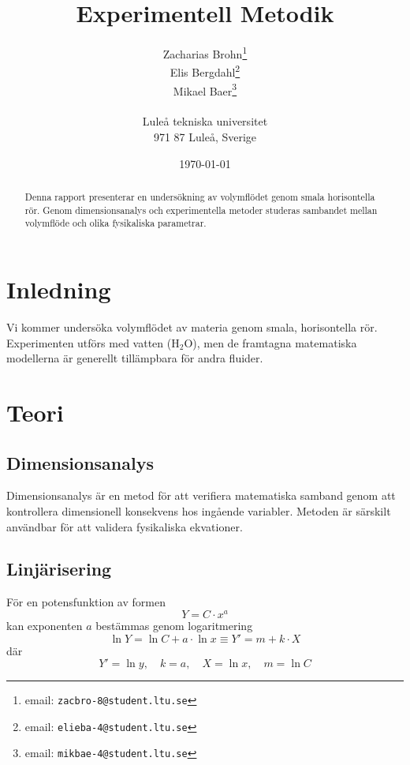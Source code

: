 \documentclass[a4paper,12pt]{article}
\begin{document}
%
\title{Experimentell Metodik}
%
\author{Zacharias Brohn\thanks{email: \texttt{zacbro-8@student.ltu.se}}\\  
        Elis Bergdahl\thanks{email: \texttt{elieba-4@student.ltu.se}} \\
        Mikael Baer\thanks{email: \texttt{mikbae-4@student.ltu.se}} \\
        \\
        Luleå tekniska universitet \\ 
        971 87 Luleå, Sverige}
%
\date{\today}
%
\maketitle
%
\begin{abstract}
    Denna rapport presenterar en undersökning av volymflödet genom smala horisontella rör. 
    Genom dimensionsanalys och experimentella metoder studeras sambandet mellan volymflöde 
    och olika fysikaliska parametrar.
\end{abstract}
%
\section{Inledning}
Vi kommer undersöka volymflödet av materia genom smala, horisontella rör. 
Experimenten utförs med vatten ($\mathrm{H_2O}$), men de framtagna matematiska 
modellerna är generellt tillämpbara för andra fluider.
%
\section{Teori}
%
\subsection{Dimensionsanalys}
Dimensionsanalys är en metod för att verifiera matematiska samband genom att 
kontrollera dimensionell konsekvens hos ingående variabler. Metoden är särskilt 
användbar för att validera fysikaliska ekvationer.
%
\subsection{Linjärisering}
För en potensfunktion av formen
\begin{equation}
    Y = C \cdot x^a
\end{equation}
kan exponenten $a$ bestämmas genom logaritmering
\begin{equation}
    \ln Y = \ln C + a \cdot \ln x \equiv Y' = m + k \cdot X
\end{equation}
där
\begin{equation}
    Y' = \ln y,\quad k = a,\quad X = \ln x,\quad m = \ln C
\end{equation}
%
\end{document}
